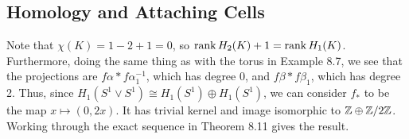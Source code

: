 \documentclass[../../solutions.tex]{subfiles}
\begin{document}
\subsection{Homology and Attaching Cells}
\begin{exercise} \leavevmode
Note that $\chi(K)=1-2+1=0$, so $\operatorname{rank} H_2(K)+1=\operatorname{rank} H_1(K)$.
Furthermore, doing the same thing as with the torus in Example 8.7, we see that the projections are $f\alpha*f\alpha_1^{-1}$, which has degree 0, and $f\beta*f\beta_1$, which has degree 2.
Thus, since $H_1(S^1\vee S^1)\cong H_1(S^1)\oplus H_1(S^1)$, we can consider $f_*$ to be the map $x\mapsto(0,2x)$.
It has trivial kernel and image isomorphic to $\mathbb{Z}\oplus\mathbb{Z}/2\mathbb{Z}$.
Working through the exact sequence in Theorem 8.11 gives the result.
\end{exercise}
\end{document}

